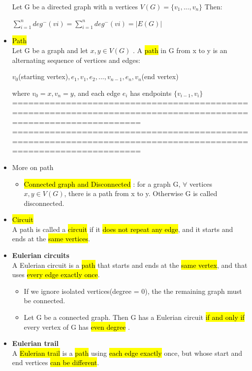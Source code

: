 \documentclass{article}
\begin{document}
\begin{itemize}
Let G be a directed graph with n vertices $ V(G) = \{v_1,..., v_n\} $ Then:
\begin{center}
$\sum^{n}_{i = 1} deg^{-} (vi) = \sum^{n}_{i = 1} deg^{-} (vi) = |E(G)|$
\end{center}

\item \hl{Path}\\
Let G be a graph and let $x,y \in V(G)$ . A \hl{path} in G from x to y is an alternating sequence of vertices and edges:
\begin{center}
$v_0$(starting vertex)$,e_1,v_1,e_2,...,v_{n-1},e_n,v_n$(end vertex)
\end{center}
where $v_0 = x, v_n = y$, and each edge $e_i$ has endpoints $\{v_{i-1} , v_i\}$\\
================================================================================================================
\newpage
================================================================================================================\\


\item More on path
\begin{itemize}
\item \hl{Connected graph and Disconnected} : for a graph G, $\forall$ vertices $x,y \in V(G)$, there is a path from x to y. Otherwise G is called disconnected.

\end{itemize}

\item \hl{Circuit}\\
A path is called a \hl{circuit} if it \hl{does not repeat any edge},
and it starts and ends at the \hl{same vertices}.

\item \textbf{Eulerian circuits}\\
A Eulerian circuit is a \hl{path} that starts and ends at the \hl{same vertex}, and
that uses \hl{every edge exactly once}.
\begin{itemize}
\item If we ignore isolated vertices(degree = 0), the the remaining graph must be connected.
\item Let G be a connected graph. Then G has a Eulerian circuit \hl{if and only if} every vertex of G has \hl{even degree} .
\end{itemize}

\item \textbf{Eulerian trail} \\
A \hl{Eulerian trail} is a \hl{path} using \hl{each edge exactly} once, but whose start
and end vertices \hl{can be different}.


\end{itemize}
\end{document}
